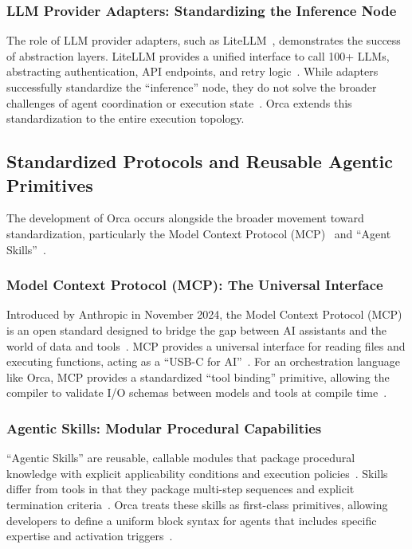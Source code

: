 \documentclass[sigconf,nonacm]{acmart}
\begin{document}
\subsubsection{LLM Provider Adapters: Standardizing the Inference Node}
\label{sec:litreview:litellm}

The role of LLM provider adapters, such as LiteLLM~\cite{litellm2024},
demonstrates the success of abstraction layers. LiteLLM provides a unified
interface to call 100+ LLMs, abstracting authentication, API endpoints, and
retry logic~\cite{litellm2024}. While adapters successfully standardize the
``inference'' node, they do not solve the broader challenges of agent
coordination or execution state~\cite{litellm2024}. Orca extends this
standardization to the entire execution topology.

\subsection{Standardized Protocols and Reusable Agentic Primitives}
\label{sec:litreview:protocols}

The development of Orca occurs alongside the broader movement toward
standardization, particularly the Model Context Protocol
(MCP)~\cite{anthropic2024mcp} and ``Agent Skills''~\cite{crewai2024}.

\subsubsection{Model Context Protocol (MCP): The Universal Interface}
\label{sec:litreview:mcp}

Introduced by Anthropic in November 2024, the Model Context Protocol (MCP)
is an open standard designed to bridge the gap between AI assistants and
the world of data and tools~\cite{anthropic2024mcp}. MCP provides a universal
interface for reading files and executing functions, acting as a ``USB-C for
AI''~\cite{anthropic2024mcp}. For an orchestration language like Orca, MCP
provides a standardized ``tool binding'' primitive, allowing the compiler
to validate I/O schemas between models and tools at compile
time~\cite{anthropic2024mcp,docker2025cagent}.

\subsubsection{Agentic Skills: Modular Procedural Capabilities}
\label{sec:litreview:skills}

``Agentic Skills'' are reusable, callable modules that package procedural
knowledge with explicit applicability conditions and execution
policies~\cite{manias2024skills}. Skills differ from tools in that they
package multi-step sequences and explicit termination
criteria~\cite{manias2024skills}. Orca treats these skills as first-class
primitives, allowing developers to define a uniform block syntax for agents
that includes specific expertise and activation triggers~\cite{manias2024skills}.
\end{document}
